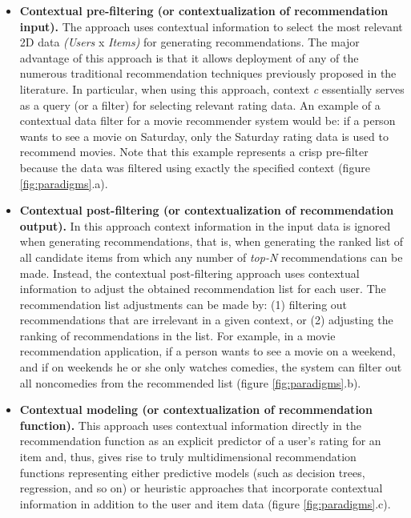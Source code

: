 \begin{itemize}
\item \textbf{Contextual pre-filtering (or contextualization of
recommendation input).} The approach uses contextual information to
select the most relevant 2D data \textit{(Users} x \textit{Items)} for generating
recommendations. The major advantage of this approach is that it
allows deployment of any of the numerous traditional recommendation
techniques previously proposed in the 
literature\cite{adomavicius2005toward}.
In particular, when using this approach, context
\textit{c} essentially serves as a query (or a filter) for selecting
relevant rating data. An example of a contextual data filter for a
movie recommender system would be: if a person wants to see a movie on
Saturday, only the Saturday rating data is used to recommend movies.
Note that this example represents a crisp pre-filter because the data
was filtered using exactly the specified context (figure
\ref{fig:paradigms}.a).
\item \textbf{Contextual post-filtering (or contextualization of
recommendation output).} In this approach context information
in the input data is ignored when generating recommendations, that is, when
generating the ranked list of all candidate items from which any
number of \textit{top-N} recommendations can be made. Instead,  the
contextual post-filtering approach uses contextual information to
adjust the obtained recommendation list for each user. The
recommendation list adjustments can be made by: (1) filtering out
recommendations that are irrelevant in a given context, or (2)
adjusting the ranking of recommendations in the list. For example, in
a movie recommendation application, if a person wants to see a movie
on a weekend, and if on weekends he or she only watches comedies, the
system can filter out all noncomedies from the recommended list
(figure \ref{fig:paradigms}.b).
\item \textbf{Contextual modeling (or contextualization of
recommendation function).} This approach uses contextual information
directly in the recommendation function as an explicit predictor of a
user's rating for an item and, thus, gives rise to truly
multidimensional recommendation functions representing either
predictive models (such as decision trees, regression, and so on) or
heuristic approaches that incorporate contextual information in
addition to the user and item data (figure \ref{fig:paradigms}.c).\\
\end{itemize}








